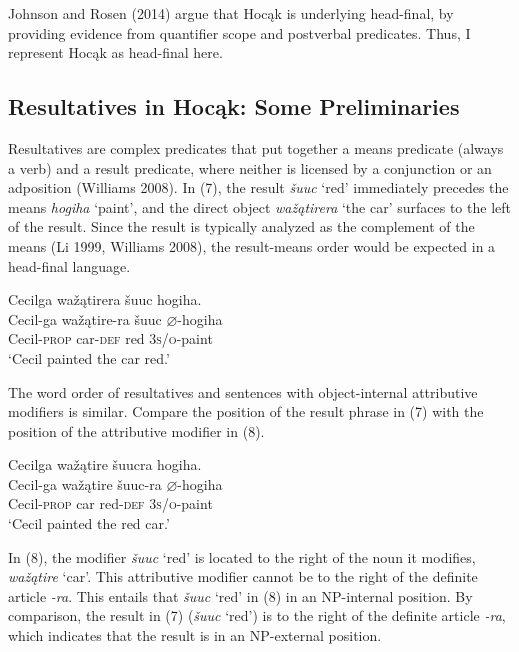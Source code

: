 \documentclass[output=paper]{LSP/langsci}
\begin{document}
Johnson and Rosen (2014) argue that Hocąk is underlying head-final, by providing evidence from quantifier scope and postverbal predicates. Thus, I represent Hocąk as head-final here.

\subsection{Resultatives in Hocąk: Some Preliminaries}

Resultatives are complex predicates that put together a means predicate (always a verb) and a result predicate, where neither is licensed by a conjunction or an adposition (Williams 2008). In (7), the result \textit{šuuc} `red' immediately precedes the means \textit{hogiha} `paint', and the direct object \textit{wažątirera} `the car' surfaces to the left of the result. Since the result is typically analyzed as the complement of the means (Li 1999, Williams 2008), the result-means order would be expected in a head-final language.

\begin{exe}

\ex \glll Cecilga wažątirera šuuc hogiha. \\
Cecil-ga  wažątire-ra šuuc {$\varnothing$}-hogiha \\
Cecil-\textsc{prop} car-\textsc{def} red \textsc{3s/o}-paint\\
\glt `Cecil painted the car red.'

\end{exe}

The word order of resultatives and sentences with object-internal attributive modifiers is similar. Compare the position of the result phrase in (7) with the position of the attributive modifier in (8).

\begin{exe}

\ex \glll Cecilga wažątire šuucra hogiha. \\
Cecil-ga  wažątire šuuc-ra  {$\varnothing$}-hogiha\\
Cecil-\textsc{prop} car red-\textsc{def}  \textsc{3s/o}-paint\\
\glt `Cecil painted the red car.'

\end{exe}

In (8), the modifier \textit{šuuc} `red' is located to the right of the noun it modifies, \textit{wažątire} `car'. This attributive modifier cannot be to the right of the definite article \textit{-ra}. This entails that \textit{šuuc} `red' in (8) in an NP-internal position. By comparison, the result in (7) (\textit{šuuc} `red') is to the right of the definite article \textit{-ra}, which indicates that the result is in an NP-external position.
\end{document}

